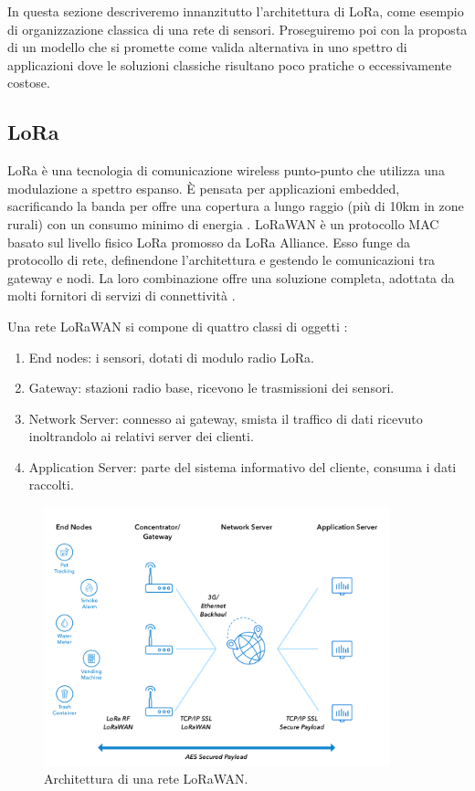 \documentclass[a4paper,12pt]{article}
\theoremstyle{definition}
\begin{document}
In questa sezione descriveremo innanzitutto l'architettura di LoRa, come esempio di organizzazione classica di una rete di sensori. Proseguiremo poi con la proposta di un modello che si promette come valida alternativa in uno spettro di applicazioni dove le soluzioni classiche risultano poco pratiche o eccessivamente costose.

\subsection{LoRa}

LoRa è una tecnologia di comunicazione wireless punto-punto che utilizza una modulazione a spettro espanso. È pensata per applicazioni embedded, sacrificando la banda per offre una copertura a lungo raggio (più di 10km in zone rurali) con un consumo minimo di energia \cite{loraperf}. LoRaWAN è un protocollo MAC basato sul livello fisico LoRa promosso da LoRa Alliance. Esso funge da protocollo di rete, definendone l'architettura e gestendo le comunicazioni tra gateway e nodi. La loro combinazione offre una soluzione completa, adottata da molti fornitori di servizi di connettività \cite{netprov}.

Una rete LoRaWAN si compone di quattro classi di oggetti \cite{loraspec}:

\begin{enumerate}
\item End nodes: i sensori, dotati di modulo radio LoRa.
\item Gateway: stazioni radio base, ricevono le trasmissioni dei sensori.
\item Network Server: connesso ai gateway, smista il traffico di dati ricevuto inoltrandolo ai relativi server dei clienti.
\item Application Server: parte del sistema informativo del cliente, consuma i dati raccolti.
\end{enumerate}

\begin{figure}[H]
\centering
\includegraphics[width=10cm]{figures/lorawan.png}
\caption{Architettura di una rete LoRaWAN.}
\end{figure}
\end{document}
